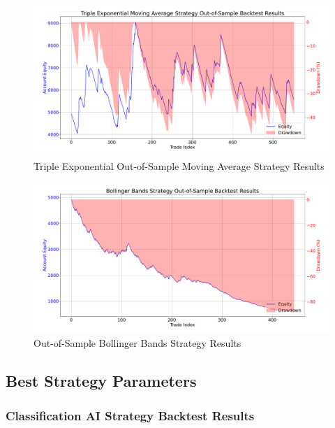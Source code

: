 \begin{figure}[H]
    \centering
    \includegraphics[width=\textwidth]{images/backtests/triple-ema-results-oof}
    \caption{Triple Exponential Out-of-Sample Moving Average Strategy Results}
\end{figure}

\begin{figure}[H]
    \centering
    \includegraphics[width=\textwidth]{images/backtests/bb-results-oof}
    \caption{Out-of-Sample Bollinger Bands Strategy Results}
\end{figure}

\subsection{Best Strategy Parameters}
\label{chap:best-strategy-parameters}

\subsubsection{Classification AI Strategy Backtest Results}


